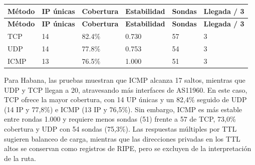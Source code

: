 \endgroup
\begingroup
\fontsize{9}{11}\selectfont
\addtocounter{table}{-1}
\begin{longtable}{p{3.1cm}p{1.9cm}p{2.1cm}p{2.1cm}p{1.8cm}p{2.1cm}}
\toprule
\textbf{Método} & \textbf{IP únicas} & \textbf{Cobertura} & \textbf{Estabilidad} & \textbf{Sondas} & \textbf{Llegada / 3} \\ \midrule
\endfirsthead
\toprule
\textbf{Método} & \textbf{IP únicas} & \textbf{Cobertura} & \textbf{Estabilidad} & \textbf{Sondas} & \textbf{Llegada / 3} \\ \midrule
\endhead
TCP & 14 & 82.4\% & 0.730 & 57 & 3 \\
UDP & 14 & 77.8\% & 0.753 & 54 & 3 \\
ICMP & 13 & 76.5\% & 1.000 & 51 & 3 \\
\bottomrule
\end{longtable}
\endgroup


Para Habana, las pruebas muestran que ICMP alcanza 17 saltos, mientras que UDP y TCP llegan a 20, atravesando más interfaces de AS11960. En este caso, TCP ofrece la mayor cobertura, con 14 UP únicas y un 82,4\% seguido de UDP (14 IP y 77,8\%) e ICMP (13 IP y 76,5\%). Sin embargo, ICMP es más estable entre rondas 1.000 y requiere menos sondas (51) frente a 57 de TCP, 73,0\% cobertura  y UDP con 54 sondas (75,3\%). Las respuestas múltiples por TTL sugieren balanceo de carga, mientras que las direcciones privadas en los TTL altos se conservan como registros de RIPE, pero se excluyen de la interpretación de la ruta.


